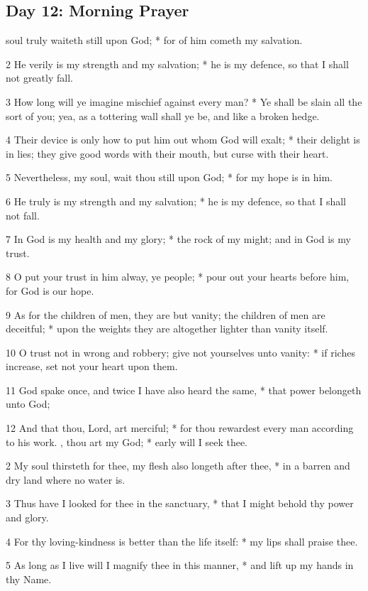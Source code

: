 \subsection{Day 12: Morning Prayer}
 soul truly waiteth still upon God; * for of him cometh my salvation.\par
2 He verily is my strength and my salvation; * he is my defence, so that I shall not greatly fall.\par
3 How long will ye imagine mischief against every man? * Ye shall be slain all the sort of you; yea, as a tottering wall shall ye be, and like a broken hedge.\par
4 Their device is only how to put him out whom God will exalt; * their delight is in lies; they give good words with their mouth, but curse with their heart.\par
5 Nevertheless, my soul, wait thou still upon God; * for my hope is in him.\par
6 He truly is my strength and my salvation; * he is my defence, so that I shall not fall.\par
7 In God is my health and my glory; * the rock of my might; and in God is my trust.\par
8 O put your trust in him alway, ye people; * pour out your hearts before him, for God is our hope.\par
9 As for the children of men, they are but vanity; the children of men are deceitful; * upon the weights they are altogether lighter than vanity itself.\par
10 O trust not in wrong and robbery; give not yourselves unto vanity: * if riches increase, set not your heart upon them.\par
11 God spake once, and twice I have also heard the same, * that power belongeth unto God;\par
12 And that thou, Lord, art merciful; * for thou rewardest every man according to his work.
, thou art my God; * early will I seek thee.\par
2 My soul thirsteth for thee, my flesh also longeth after thee, * in a barren and dry land where no water is.\par
3 Thus have I looked for thee in the sanctuary, * that I might behold thy power and glory.\par
4 For thy loving-kindness is better than the life itself: * my lips shall praise thee.\par
5 As long as I live will I magnify thee in this manner, * and lift up my hands in thy Name.\par
